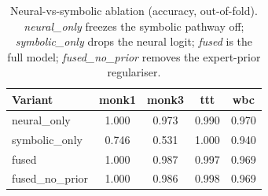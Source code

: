 \begin{table}[t]\centering
\small
\caption{Neural-vs-symbolic ablation (accuracy, out-of-fold). \emph{neural\_only} freezes the symbolic pathway off; \emph{symbolic\_only} drops the neural logit; \emph{fused} is the full model; \emph{fused\_no\_prior} removes the expert-prior regulariser.}
\label{tab:ablation}
\begin{tabular}{lcccc}
\toprule
Variant & monk1 & monk3 & ttt & wbc \\
\midrule
neural\_only & 1.000 & 0.973 & 0.990 & 0.970 \\
symbolic\_only & 0.746 & 0.531 & 1.000 & 0.940 \\
fused & 1.000 & 0.987 & 0.997 & 0.969 \\
fused\_no\_prior & 1.000 & 0.986 & 0.998 & 0.969 \\
\bottomrule
\end{tabular}
\end{table}